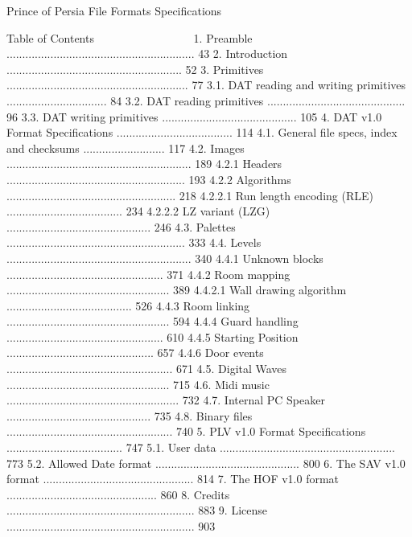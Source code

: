 
                             Prince of Persia
                               File Formats
                              Specifications

Table of Contents
~~~~~ ~~ ~~~~~~~~
1. Preamble ............................................................ 43
2. Introduction ........................................................ 52
3. Primitives .......................................................... 77
3.1. DAT reading and writing primitives ................................ 84
3.2. DAT reading primitives ............................................ 96
3.3. DAT writing primitives ........................................... 105
4. DAT v1.0 Format Specifications ..................................... 114
4.1. General file specs, index and checksums .......................... 117
4.2. Images ........................................................... 189
4.2.1 Headers ......................................................... 193
4.2.2 Algorithms ...................................................... 218
4.2.2.1 Run length encoding (RLE) ..................................... 234
4.2.2.2 LZ variant (LZG) .............................................. 246
4.3. Palettes ......................................................... 333
4.4. Levels ........................................................... 340
4.4.1 Unknown blocks .................................................. 371
4.4.2 Room mapping .................................................... 389
4.4.2.1 Wall drawing algorithm ........................................ 526
4.4.3 Room linking .................................................... 594
4.4.4 Guard handling .................................................. 610
4.4.5 Starting Position ............................................... 657
4.4.6 Door events ..................................................... 671
4.5. Digital Waves .................................................... 715
4.6. Midi music ....................................................... 732
4.7. Internal PC Speaker .............................................. 735
4.8. Binary files ..................................................... 740
5. PLV v1.0 Format Specifications ..................................... 747
5.1. User data ........................................................ 773
5.2. Allowed Date format .............................................. 800
6. The SAV v1.0 format ................................................ 814
7. The HOF v1.0 format ................................................ 860
8. Credits ............................................................ 883
9. License ............................................................ 903


